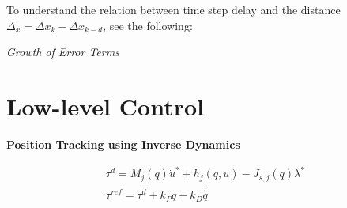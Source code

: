 \documentclass{article}
\begin{document}
To understand the relation between time step delay and the distance $\Delta_x = \Delta x_k - \Delta x_{k-d}$, see the following:


\begin{center}
    \textit{Growth of Error Terms}
\end{center}





\section{Low-level Control}

\textbf{Position Tracking using Inverse Dynamics}

\begin{gather}
    \tau^d = M_j(q)\dot{u}^* + h_j(q, u) - J_{s, j}(q)\lambda^* \\
    \tau^{ref} = \tau^d + k_P \tilde{q} + k_D \dot{\tilde{q}}
\end{gather}

\printbibliography
\end{document}
